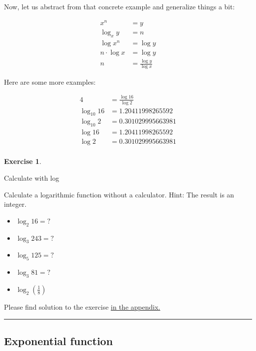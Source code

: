 \documentclass[
  12pt,
  oneside]{book}
\providecommand{\tightlist}{%
  \setlength{\itemsep}{0pt}\setlength{\parskip}{0pt}}
\theoremstyle{definition}
\theoremstyle{definition}
\theoremstyle{definition}
\newtheorem{exercise}{Exercise}[chapter]
\theoremstyle{definition}
\theoremstyle{remark}
\begin{document}
Now, let us abstract from that concrete example and generalize things a bit:

\begin{align*}
x^n &= y \\
\log_x y &= n \\
\log x^n &= \log y \\
n\cdot \log x &= \log y \\
n &= \frac{\log y}{\log x} 
\end{align*}

Here are some more examples:

\begin{align*}
4 &= \frac{\log 16}{\log 2} \\
\log_{10}16 &= 1.20411998265592 \\
\log_{10}2 &= 0.301029995663981 \\
\log 16 &= 1.20411998265592 \\
\log 2 &= 0.301029995663981 \\
\end{align*}

\begin{exercise}
\protect\hypertarget{exr:calcwlog}{}\label{exr:calcwlog}

Calculate with log

Calculate a logarithmic function without a calculator. Hint: The result is an integer.

\begin{itemize}
\tightlist
\item
  \(\log_2 16 = ?\)
\item
  \(\log_3 243 = ?\)
\item
  \(\log_5 125 = ?\)
\item
  \(\log_3 81 = ?\)
\item
  \(\log_2 \left(\frac{1}{8}\right)\)
\end{itemize}

Please find solution to the exercise \protect\hyperlink{sol:calcwlog}{in the appendix.}

\begin{center}\rule{0.5\linewidth}{0.5pt}\end{center}

\end{exercise}

\hypertarget{exponential-function}{%
\subsection{Exponential function}\label{exponential-function}}
\end{document}
